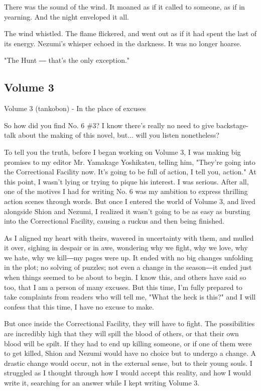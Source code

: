 There was the sound of the wind. It moaned as if it called to someone,
as if in yearning. And the night enveloped it all.

The wind whistled. The flame flickered, and went out as if it had spent
the last of its energy. Nezumi's whisper echoed in the darkness. It was
no longer hoarse.

"The Hunt ― that's the only exception."

\protect\hypertarget{index_split_137.html}{}{}

\hypertarget{index_split_137.htmlux5cux23calibre_pb_141}{%
\subsection{Volume 3}\label{index_split_137.htmlux5cux23calibre_pb_141}}

Volume 3 (tankobon) - In the place of excuses

So how did you find No. 6 \#3? I know there's really no need to give
backstage-talk about the making of this novel, but... will you listen
nonetheless?

To tell you the truth, before I began working on Volume 3, I was making
big promises to my editor Mr. Yamakage Yoshikatsu, telling him, "They're
going into the Correctional Facility now. It's going to be full of
action, I tell you, action." At this point, I wasn't lying or trying to
pique his interest. I was serious. After all, one of the motives I had
for writing No. 6 was my ambition to express thrilling action scenes
through words. But once I entered the world of Volume 3, and lived
alongside Shion and Nezumi, I realized it wasn't going to be as easy as
bursting into the Correctional Facility, causing a ruckus and then being
finished.

As I aligned my heart with theirs, wavered in uncertainty with them, and
mulled it over, sighing in despair or in awe, wondering why we fight,
why we love, why we hate, why we kill―my pages were up. It ended with no
big changes unfolding in the plot; no solving of puzzles; not even a
change in the season―it ended just when things seemed to be about to
begin. I know this, and others have said so too, that I am a person of
many excuses. But this time, I'm fully prepared to take complaints from
readers who will tell me, "What the heck is this?" and I will confess
that this time, I have no excuse to make.

But once inside the Correctional Facility, they will have to fight. The
possibilities are incredibly high that they will spill the blood of
others, or that their own blood will be spilt. If they had to end up
killing someone, or if one of them were to get killed, Shion and Nezumi
would have no choice but to undergo a change. A drastic change would
occur, not in the external sense, but to their young souls. I struggled
as I thought through how I would accept this reality, and how I would
write it, searching for an answer while I kept writing Volume 3.

